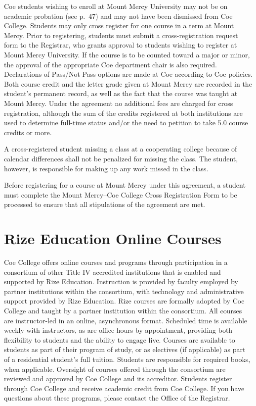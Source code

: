 \documentclass[
  letterpaper,
]{scrbook}
\begin{document}
Coe students wishing to enroll at Mount Mercy University may not be on
academic probation (see p.~47) and may not have been dismissed from Coe
College. Students may only cross register for one course in a term at
Mount Mercy. Prior to registering, students must submit a
cross-registration request form to the Registrar, who grants approval to
students wishing to register at Mount Mercy University. If the course is
to be counted toward a major or minor, the approval of the appropriate
Coe department chair is also required. Declarations of Pass/Not Pass
options are made at Coe according to Coe policies. Both course credit
and the letter grade given at Mount Mercy are recorded in the student's
permanent record, as well as the fact that the course was taught at
Mount Mercy. Under the agreement no additional fees are charged for
cross registration, although the sum of the credits registered at both
institutions are used to determine full-time status and/or the need to
petition to take 5.0 course credits or more.

A cross-registered student missing a class at a cooperating college
because of calendar differences shall not be penalized for missing the
class. The student, however, is responsible for making up any work
missed in the class.

Before registering for a course at Mount Mercy under this agreement, a
student must complete the Mount Mercy--Coe College Cross Registration
Form to be processed to ensure that all stipulations of the agreement
are met.

\section{Rize Education Online
Courses}\label{rize-education-online-courses}

Coe College offers online courses and programs through participation in
a consortium of other Title IV accredited institutions that is enabled
and supported by Rize Education. Instruction is provided by faculty
employed by partner institutions within the consortium, with technology
and administrative support provided by Rize Education. Rize courses are
formally adopted by Coe College and taught by a partner institution
within the consortium. All courses are instructor-led in an online,
asynchronous format. Scheduled time is available weekly with
instructors, as are office hours by appointment, providing both
flexibility to students and the ability to engage live. Courses are
available to students as part of their program of study, or as electives
(if applicable) as part of a residential student's full tuition.
Students are responsible for required books, when applicable. Oversight
of courses offered through the consortium are reviewed and approved by
Coe College and its accreditor. Students register through Coe College
and receive academic credit from Coe College. If you have questions
about these programs, please contact the Office of the Registrar.
\end{document}
